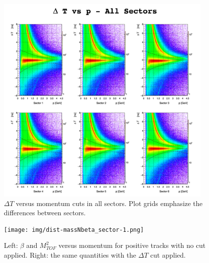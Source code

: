 \begin{figure}[ht]
	\centering
		\includegraphics[width=0.95\textwidth]{img/dist-dtfit_sector-all.png}
		\caption{$\Delta T$ versus momentum cuts in all sectors. Plot grids
					emphasize the differences between sectors.}
		\label{fig:dt_vs_mom_all_sectors}
\end{figure}







\begin{figure}[ht]
	\centering
		\texttt{[image: img/dist-massNbeta\_sector-1.png]}
		\caption{Left: $\beta$ and $M_{TOF}^2$ versus momentum for positive
					tracks with no cut applied. Right: the same quantities with the
					$\Delta T$ cut applied.}
		\label{fig:mass_beta_vs_p_sect5}
\end{figure}



\clearpage







